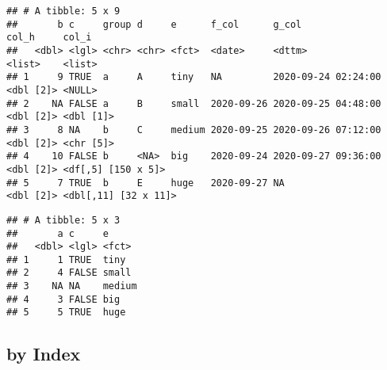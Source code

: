 \documentclass[
]{book}
\newenvironment{Shaded}{\begin{snugshade}}{\end{snugshade}}
\newcommand{\KeywordTok}[1]{\textcolor[rgb]{0.13,0.29,0.53}{\textbf{#1}}}
\newcommand{\NormalTok}[1]{#1}
\newcommand{\OperatorTok}[1]{\textcolor[rgb]{0.81,0.36,0.00}{\textbf{#1}}}
\newcommand{\StringTok}[1]{\textcolor[rgb]{0.31,0.60,0.02}{#1}}
\begin{document}
\begin{Shaded}
\end{Shaded}

\begin{verbatim}
## # A tibble: 5 x 9
##       b c     group d     e      f_col      g_col               col_h     col_i               
##   <dbl> <lgl> <chr> <chr> <fct>  <date>     <dttm>              <list>    <list>              
## 1     9 TRUE  a     A     tiny   NA         2020-09-24 02:24:00 <dbl [2]> <NULL>              
## 2    NA FALSE a     B     small  2020-09-26 2020-09-25 04:48:00 <dbl [2]> <dbl [1]>           
## 3     8 NA    b     C     medium 2020-09-25 2020-09-26 07:12:00 <dbl [2]> <chr [5]>           
## 4    10 FALSE b     <NA>  big    2020-09-24 2020-09-27 09:36:00 <dbl [2]> <df[,5] [150 x 5]>  
## 5     7 TRUE  b     E     huge   2020-09-27 NA                  <dbl [2]> <dbl[,11] [32 x 11]>
\end{verbatim}

\begin{Shaded}
\end{Shaded}

\begin{verbatim}
## # A tibble: 5 x 3
##       a c     e     
##   <dbl> <lgl> <fct> 
## 1     1 TRUE  tiny  
## 2     4 FALSE small 
## 3    NA NA    medium
## 4     3 FALSE big   
## 5     5 TRUE  huge
\end{verbatim}

\hypertarget{by-index}{%
\subsection{by Index}\label{by-index}}

\begin{Shaded}
\end{Shaded}
\end{document}

